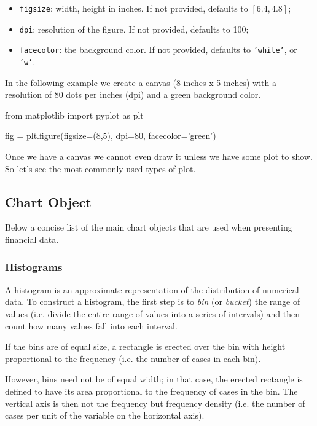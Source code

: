 \begin{ipython}
\begin{itemize}
	\tightlist
	\item
	\texttt{figsize}: width, height in inches. If not provided, defaults
	to \([6.4, 4.8]\);
	\item
	\texttt{dpi}: resolution of the figure. If not provided, defaults to
	100;
	\item
	\texttt{facecolor}: the background color. If not provided, defaults to
	\texttt{'white'}, or \texttt{'w'}.
\end{itemize}

In the following example we create a canvas (8 inches x 5 inches) with a resolution of 80 dots per inches (dpi) and a green background color.

\begin{ipython}
from matplotlib import pyplot as plt

fig = plt.figure(figsize=(8,5), dpi=80, facecolor='green')
\end{ipython}

Once we have a canvas we cannot even draw it unless we have some plot to
show. So let's see the most commonly used types of plot.

\subsection{Chart Object}\label{chart-object}

Below a concise list of the main chart objects that are used when presenting financial data.

\subsubsection{Histograms}\label{histograms}

A histogram is an approximate representation of the distribution of numerical data. To construct a histogram, the first step is to \emph{bin} (or \emph{bucket}) the range of values (i.e. divide the entire range of values into a series of intervals) and then count how many values fall into each interval.

If the bins are of equal size, a rectangle is erected over the bin with height proportional to the frequency (i.e. the number of cases in each bin).

However, bins need not be of equal width; in that case, the erected rectangle is defined to have its area proportional to the frequency of cases in the bin. The vertical axis is then not the frequency but frequency density (i.e. the number of cases per unit of the variable on the horizontal axis).


\end{ipython}
